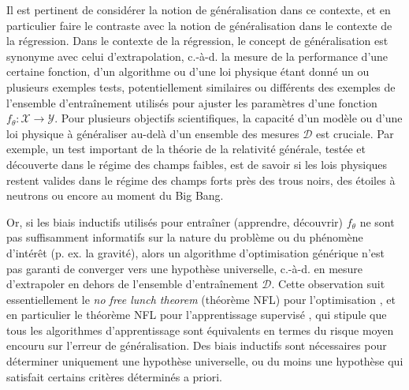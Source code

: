 Il est pertinent de considérer la notion de généralisation dans ce contexte, et en particulier faire le contraste avec 
la notion de généralisation dans le contexte de la régression. Dans le contexte de la régression, le concept de généralisation est synonyme 
avec celui d'extrapolation, c.-à-d. la mesure de la performance d'une certaine fonction, d'un algorithme ou d'une loi physique 
étant donné un ou plusieurs exemples tests, 
potentiellement similaires ou différents des exemples de l'ensemble d'entraînement utilisés pour ajuster les paramètres d'une fonction 
$f_\theta: \mathcal{X} \rightarrow \mathcal{Y}$. Pour plusieurs objectifs scientifiques, la capacité d'un modèle ou d'une loi physique  
à généraliser au-delà d'un ensemble des mesures $\mathcal{D}$ est cruciale. 
Par exemple, un test important de la théorie de la relativité générale, testée et découverte dans le régime des champs faibles, est 
de savoir si les lois physiques restent valides dans le régime des champs forts près des trous noirs, des étoiles à neutrons ou encore 
au moment du Big Bang. 

Or, si les biais inductifs utilisés pour entraîner (apprendre, découvrir) $f_{\theta}$ ne sont pas suffisamment 
informatifs sur la nature du problème ou du phénomène d'intérêt (p. ex. la gravité), 
alors un algorithme d'optimisation générique n'est pas garanti de converger vers 
une hypothèse universelle, c.-à-d. en mesure d'extrapoler en dehors de l'ensemble 
d'entraînement $\mathcal{D}$.
Cette observation suit essentiellement le \textit{no free lunch theorem} (théorème NFL) pour 
l'optimisation \citep{Wolpert1997}, et en particulier 
le théorème NFL pour l'apprentissage supervisé \citep{Wolpert1992,Wolpert1996}, qui stipule que tous les 
algorithmes d'apprentissage %
sont équivalents en termes du risque moyen encouru sur l'erreur de généralisation. 
Des biais inductifs sont nécessaires pour déterminer uniquement une hypothèse universelle, 
ou du moins une hypothèse qui satisfait certains critères déterminés a priori.

